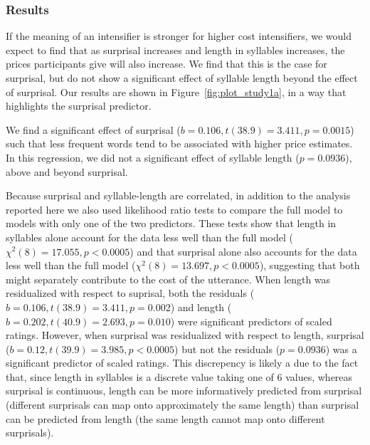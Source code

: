 \documentclass[10pt,letterpaper]{article}
\newcommand{\ndg}[1]{{\color{green}#1}}
\begin{document}
\subsubsection{Results}

If the meaning of an intensifier is stronger for higher cost intensifiers, we would expect to find that as surprisal increases and length in syllables increases, the prices participants give will also increase. 
We find that this is the case for surprisal, but do not show a significant effect of syllable length beyond the effect of surprisal.
Our results are shown in Figure~\ref{fig:plot_study1a}, in a way that highlights the surprisal predictor. 

We find a significant effect of surprisal ($b=0.106,t(38.9)=3.411,p=0.0015$) such that less frequent words tend to be associated with higher price estimates.
In this regression, we did not a significant effect of syllable length ($p=0.0936$), above and beyond surprisal.

Because surprisal and syllable-length are correlated, in addition to the analysis reported here we also used likelihood ratio tests to compare the full model to models with only one of the two predictors.
These tests show that length in syllables alone account for the data less well than the full model ($\chi^2(8)=17.055, p<0.0005$) and that surprisal alone also accounts for the data less well than the full model ($\chi^2(8)=13.697, p<0.0005$), suggesting that both might separately contribute to the cost of the utterance.
When length was residualized with respect to suprisal, both the residuals ($b=0.106,t(38.9)=3.411,p=0.002$) and length ($b=0.202,t(40.9)=2.693,p=0.010$) were significant predictors of scaled ratings. However, when surprisal was residualized with respect to length, surprisal ($b=0.12, t(39.9)=3.985, p<0.0005$) but not the residuals ($p=0.0936$) was a significant predictor of scaled ratings. This discrepency is likely a due to the fact that, since length in syllables is a discrete value taking one of 6 values, whereas surprisal is continuous, length can be more informatively predicted from surprisal (different surprisals can map onto approximately the same length) than surprisal can be predicted from length (the same length cannot map onto different surprisals).
\end{document}
